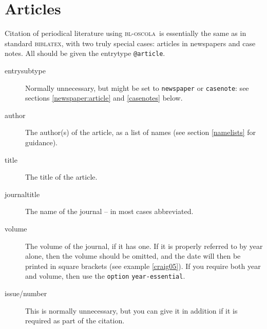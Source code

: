 \documentclass[a5paper,fontsize=9pt,DIV=1]{scrartcl}
\newcommand{\oscola}{\textsc{bl-oscola}}
\newcommand{\biblatex}{\textsc{biblatex}}
\begin{document}
\section{Articles}

Citation of periodical literature using \oscola\ is essentially the
same as in standard \biblatex, with two truly special cases: articles
in newspapers and case notes. All should be given the entrytype
\texttt{@article}.

\begin{description}
\item[entrysubtype] 
Normally unnecessary, but might be set to \verb|newspaper| or \verb|casenote|: see sections \ref{newspaper:article} and \ref{casenotes} below.
\item[author] The author(s) of the article, as a list of names (see section \ref{namelists} for guidance).
\item[title] The title of the article.
\item[journaltitle] The name of the journal -- in most cases abbreviated.
\item[volume] 
The volume of the journal, if it has one. If it is properly referred to by year alone, then the volume should be omitted, and the date will then be printed in square brackets (see example \ref{craig05}). If you require both year and volume, then use the \verb|option| \texttt{year-essential}.
\item[issue\slash number] 
This is normally unnecessary, but you can give it in addition if it is required as part of the citation.

\end{description}
\end{document}
